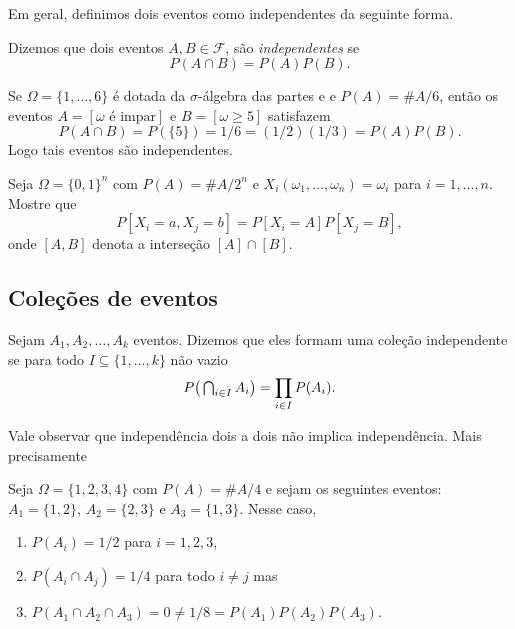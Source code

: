 Em geral, definimos dois eventos como independentes da seguinte forma.

\begin{definition}
  Dizemos que dois eventos $A, B \in \mathcal{F}$, são \emph{independentes}  se
  \begin{equation}
    P(A \cap B) = P(A) P(B).
  \end{equation}
\end{definition}

\begin{example}
  Se $\Omega = \{1, \dots, 6\}$ é dotada da $\sigma$-álgebra das partes e e $P(A) = \#A/6$, então os eventos $A = [\omega \text{ é impar}]$ e $B = [\omega \geq 5]$ satisfazem
  \begin{equation}
    P(A \cap B) = P(\{5\}) = 1/6 = (1/2) (1/3) = P(A) P(B).
  \end{equation}
  Logo tais eventos são independentes.
\end{example}


\begin{exercise}
  Seja $\Omega = \{0,1\}^n$ com $P(A) = \#A/2^n$ e $X_i(\omega_1, \dots, \omega_n) = \omega_i$ para $i = 1, \dots, n$.
  Mostre que
  \begin{equation}
    P[X_i = a, X_j = b] = P[X_i = A] P[X_j = B],
  \end{equation}
  onde $[A,B]$ denota a interseção $[A] \cap [B]$.
\end{exercise}

\subsection{Coleções de eventos}


\begin{definition}
  Sejam $A_1, A_2, \dots, A_k$ eventos.
  Dizemos que eles formam uma coleção independente  se para todo $I \subseteq \{1, \dots, k\}$ não vazio
  \begin{equation}
    P\big( \operatorname*{{\textstyle \bigcap}}\nolimits_{i \in I} A_i \big) =  \prod\limits_{i \in I} P(A_i).
  \end{equation}
\end{definition}

Vale observar que independência dois a dois não implica independência.
Mais precisamente
\begin{example}
  Seja $\Omega = \{1,2,3,4\}$ com $P(A) = \# A/4$ e sejam os seguintes eventos: $A_1 = \{1,2\}$, $A_2 = \{2,3\}$ e $A_3 = \{1,3\}$.
  Nesse caso,
  \begin{enumerate}[\quad a)]
  \item $P(A_i) = 1/2$ para $i = 1, 2, 3$,
  \item $P(A_i \cap A_j) = 1/4$ para todo $i \neq j$ mas
  \item $P(A_1 \cap A_2 \cap A_3) = 0 \neq 1/8 = P(A_1) P(A_2) P(A_3)$.
  \end{enumerate}
\end{example}

